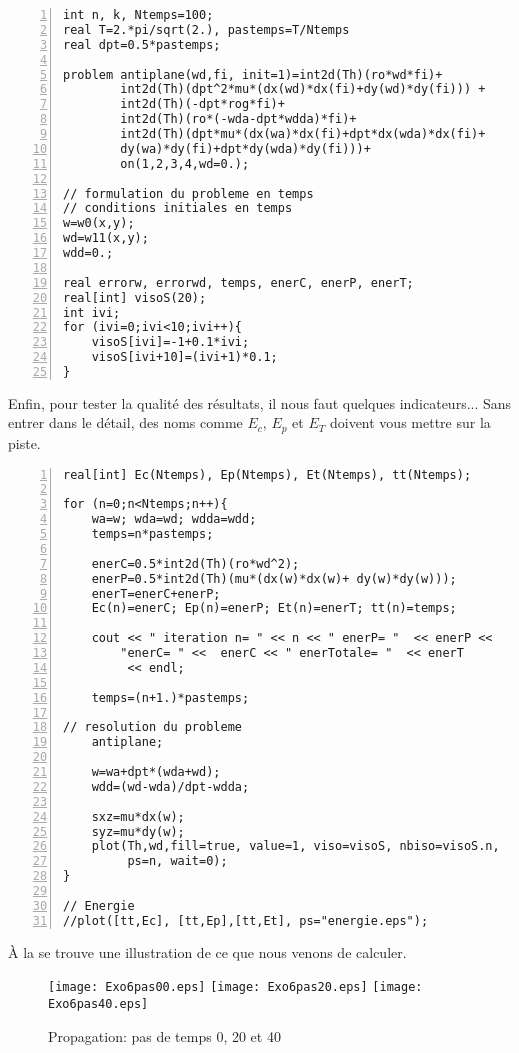 \color{gris}\scriptsize
\begin{Verbatim}[numbers=left,numbersep=3pt,firstnumber=last]
int n, k, Ntemps=100; 
real T=2.*pi/sqrt(2.), pastemps=T/Ntemps
real dpt=0.5*pastemps; 

problem antiplane(wd,fi, init=1)=int2d(Th)(ro*wd*fi)+ 
		int2d(Th)(dpt^2*mu*(dx(wd)*dx(fi)+dy(wd)*dy(fi))) + 
		int2d(Th)(-dpt*rog*fi)+
		int2d(Th)(ro*(-wda-dpt*wdda)*fi)+
		int2d(Th)(dpt*mu*(dx(wa)*dx(fi)+dpt*dx(wda)*dx(fi)+
		dy(wa)*dy(fi)+dpt*dy(wda)*dy(fi)))+
		on(1,2,3,4,wd=0.); 

// formulation du probleme en temps
// conditions initiales en temps
w=w0(x,y);
wd=w11(x,y); 
wdd=0.; 

real errorw, errorwd, temps, enerC, enerP, enerT; 
real[int] visoS(20);
int ivi; 
for (ivi=0;ivi<10;ivi++){
	visoS[ivi]=-1+0.1*ivi;
	visoS[ivi+10]=(ivi+1)*0.1;
}
\end{Verbatim}
\color{black}\normalsize

\medskip
Enfin, pour tester la qualité des résultats, il nous faut quelques indicateurs...
Sans entrer dans le détail, des noms comme $E_c$, $E_p$ et $E_T$ doivent vous mettre sur
la piste.

\color{gris}\scriptsize
\begin{Verbatim}[numbers=left,numbersep=3pt,firstnumber=last]
real[int] Ec(Ntemps), Ep(Ntemps), Et(Ntemps), tt(Ntemps); 

for (n=0;n<Ntemps;n++){	
	wa=w; wda=wd; wdda=wdd; 	
	temps=n*pastemps; 

	enerC=0.5*int2d(Th)(ro*wd^2);
	enerP=0.5*int2d(Th)(mu*(dx(w)*dx(w)+ dy(w)*dy(w)));
	enerT=enerC+enerP;
	Ec(n)=enerC; Ep(n)=enerP; Et(n)=enerT; tt(n)=temps; 
		
	cout << " iteration n= " << n << " enerP= "  << enerP << 
        "enerC= " <<  enerC << " enerTotale= "  << enerT 
         << endl;
	
	temps=(n+1.)*pastemps; 

// resolution du probleme 
	antiplane;
	
	w=wa+dpt*(wda+wd);
	wdd=(wd-wda)/dpt-wdda; 

	sxz=mu*dx(w);
	syz=mu*dy(w); 
	plot(Th,wd,fill=true, value=1, viso=visoS, nbiso=visoS.n, 
         ps=n, wait=0); 	
}

// Energie 
//plot([tt,Ec], [tt,Ep],[tt,Et], ps="energie.eps"); 
\end{Verbatim}
\color{black}\normalsize

\medskip
À la  se trouve une illustration de ce que nous venons de calculer.

\begin{figure}[ht]
   \center
   \texttt{[image: Exo6pas00.eps]} \hfill
   \texttt{[image: Exo6pas20.eps]} \hfill
   \texttt{[image: Exo6pas40.eps]}
   \caption{\label{Fig-Exo6} Propagation: pas de temps 0, 20 et 40}
\end{figure}

